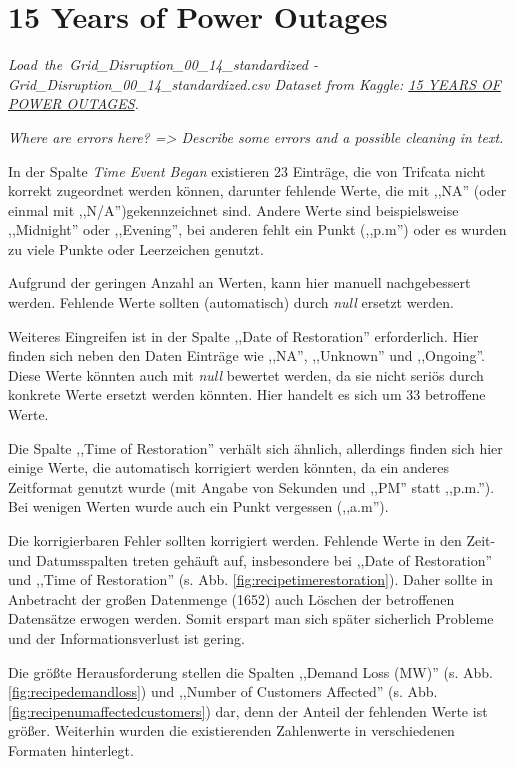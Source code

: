 \documentclass[11pt,a4paper]{article}
\begin{document}
\section{15 Years of Power Outages}

\textit{Load\ the\ Grid\_Disruption\_00\_14\_standardized -}\\ \textit{Grid\_Disruption\_00\_14\_standardized.csv Dataset from Kaggle:
\hyperref{https://www.kaggle.com/autunno/15-years-of-power-outages}{}{}{15 YEARS OF POWER OUTAGES}.}

\textit{Where are errors here? => Describe some errors and a possible cleaning in text.}

In der Spalte \textit{Time Event Began} existieren 23 Einträge, die von Trifcata nicht korrekt zugeordnet werden können, darunter fehlende Werte, die mit ,,NA'' (oder einmal mit ,,N/A'')gekennzeichnet sind. Andere Werte sind beispielsweise ,,Midnight'' oder ,,Evening'', bei anderen fehlt ein Punkt (,,p.m'') oder es wurden zu viele Punkte oder Leerzeichen genutzt.

Aufgrund der geringen Anzahl an Werten, kann hier manuell nachgebessert werden. Fehlende Werte sollten (automatisch) durch \textit{null} ersetzt werden.

Weiteres Eingreifen ist in der Spalte ,,Date of Restoration'' erforderlich. Hier finden sich neben den Daten Einträge wie ,,NA'', ,,Unknown'' und ,,Ongoing''. Diese Werte könnten auch mit \textit{null} bewertet werden, da sie nicht seriös durch konkrete Werte ersetzt werden könnten. Hier handelt es sich um 33 betroffene Werte.

Die Spalte ,,Time of Restoration'' verhält sich ähnlich, allerdings finden sich hier einige Werte, die automatisch korrigiert werden könnten, da ein anderes Zeitformat genutzt wurde (mit Angabe von Sekunden und ,,PM'' statt ,,p.m.''). Bei wenigen Werten wurde auch ein Punkt vergessen (,,a.m'').

Die korrigierbaren Fehler sollten korrigiert werden. Fehlende Werte in den Zeit- und Datumsspalten treten gehäuft auf, insbesondere bei ,,Date of Restoration'' und ,,Time of Restoration'' (s. Abb. \ref{fig:recipetimerestoration}). Daher sollte in Anbetracht der großen Datenmenge (1652) auch Löschen der betroffenen Datensätze erwogen werden. Somit erspart man sich später sicherlich Probleme und der Informationsverlust ist gering.

Die größte Herausforderung stellen die Spalten ,,Demand Loss (MW)'' (s. Abb. \ref{fig:recipedemandloss}) und ,,Number of Customers Affected'' (s. Abb. \ref{fig:recipenumaffectedcustomers}) dar, denn der Anteil der fehlenden Werte ist größer. Weiterhin wurden die existierenden Zahlenwerte in verschiedenen Formaten hinterlegt.
\end{document}
